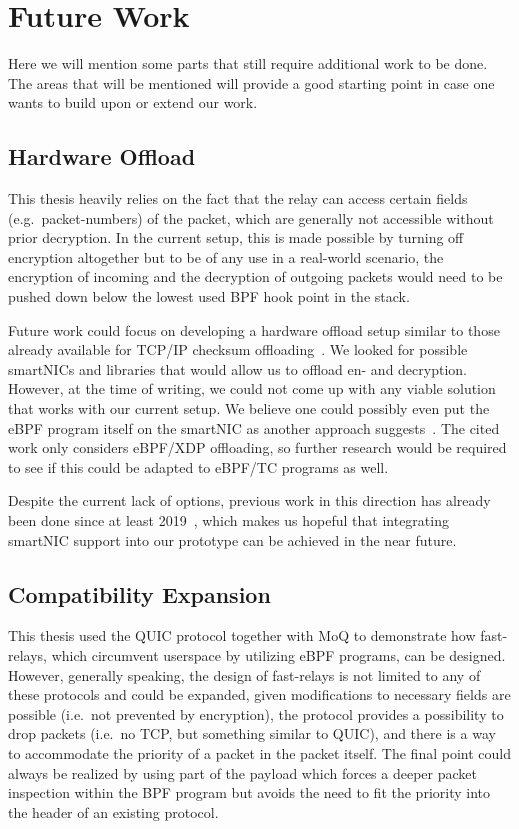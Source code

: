\section{Future Work}\label{sec:future_work}

Here we will mention some parts that still require additional work 
to be done.
The areas that will be mentioned will provide a good starting point
in case one wants to build upon or extend our work.

\subsection{Hardware Offload}
This thesis heavily relies on the fact that the relay can
access certain fields (e.g.~packet-numbers) of the packet, 
which are generally not accessible without prior decryption.
In the current setup, this is made possible by turning off 
encryption altogether but to be of any use in a real-world
scenario, the encryption of incoming and the decryption of
outgoing packets would need to be pushed down below the lowest 
used BPF hook point in the stack.

Future work could focus on developing a hardware offload 
setup similar to those already available for TCP/IP checksum 
offloading~\parencite{tcp-ip-offload-engine}.
We looked for possible smartNICs and libraries that would allow us
to offload en- and decryption.
However, at the time of writing, we could not come up with any viable solution
that works with our current setup. 
We believe one could possibly even put the eBPF program itself on the smartNIC as 
another approach suggests~\parencite{ebpf-offload-smartnics}.
The cited work only considers eBPF/XDP offloading, so further 
research would be required to see if this could be adapted to eBPF/TC 
programs as well.

Despite the current lack of options, previous work in this direction has already been 
done since at least 2019~\parencite{quic-nic-offload}, which makes us hopeful that
integrating smartNIC support into our prototype can be achieved in the near future.

\subsection{Compatibility Expansion}\label{sec:compatibility_expansion}
This thesis used the QUIC protocol together with MoQ to demonstrate how fast-relays, 
which circumvent userspace by utilizing eBPF programs, can be designed.
However, generally speaking, the design of fast-relays is not limited to
any of these protocols and could be expanded, given modifications to 
necessary fields are possible (i.e.~not prevented by encryption),
the protocol provides a possibility to drop packets (i.e.~no TCP, 
but something similar to QUIC),
and there is a way to accommodate the priority of a packet in the packet itself.
The final point could always be realized by using part of the payload
which forces a deeper packet inspection within the BPF program but 
avoids the need to fit the priority into the header of an existing 
protocol.

